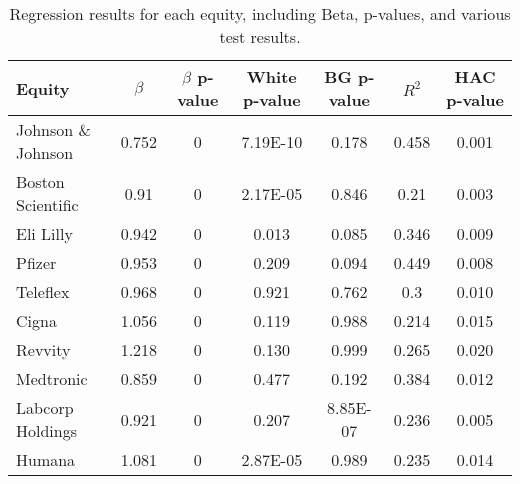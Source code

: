 \begin{table}
    \centering
    \renewcommand{\arraystretch}{1.2} %
    \footnotesize
    \begin{tabular}{|l|c|c|c|c|c|c|}
        \hline
        \rowcolor{unired!30} \textbf{Equity} & \textbf{$\beta$} & \textbf{$\beta$ p-value} & \textbf{White p-value} & \textbf{BG p-value} & \textbf{$R^2$} & \textbf{HAC p-value} \\ \hline
        Johnson \& Johnson & 0.752 & 0 & 7.19E-10 & 0.178 & 0.458 & 0.001 \\ \hline
        \rowcolor{gray!10} Boston Scientific & 0.91 & 0 & 2.17E-05 & 0.846 & 0.21 & 0.003 \\ \hline
        Eli Lilly & 0.942 & 0 & 0.013 & 0.085 & 0.346 & 0.009 \\ \hline
        \rowcolor{gray!10} Pfizer & 0.953 & 0 & 0.209 & 0.094 & 0.449 & 0.008 \\ \hline
        Teleflex & 0.968 & 0 & 0.921 & 0.762 & 0.3 & 0.010 \\ \hline
        \rowcolor{gray!10} Cigna & 1.056 & 0 & 0.119 & 0.988 & 0.214 & 0.015 \\ \hline
        Revvity & 1.218 & 0 & 0.130 & 0.999 & 0.265 & 0.020 \\ \hline
        \rowcolor{gray!10} Medtronic & 0.859 & 0 & 0.477 & 0.192 & 0.384 & 0.012 \\ \hline
        Labcorp Holdings & 0.921 & 0 & 0.207 & 8.85E-07 & 0.236 & 0.005 \\ \hline
        \rowcolor{gray!10} Humana & 1.081 & 0 & 2.87E-05 & 0.989 & 0.235 & 0.014 \\ \hline
    \end{tabular}
    \caption{Regression results for each equity, including Beta, p-values, and various test results.}
    \label{tab:equity_results}
\end{table}
